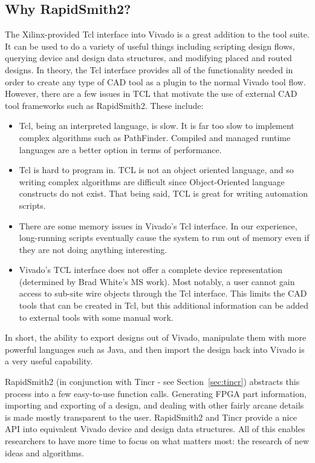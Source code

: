 \subsection{Why RapidSmith2?}
The Xilinx-provided Tcl interface into Vivado is a great addition to the tool
suite. It can be used to do a variety of useful things including scripting
design flows, querying device and design data structures, and  modifying placed
and routed designs. In theory, the Tcl interface provides all of the
functionality needed in order to create any type of CAD tool as a plugin to the
normal Vivado tool flow. However, there are a few issues in TCL that motivate
the use of external CAD tool frameworks such as RapidSmith2. These include:
\begin{itemize}
  \item Tcl, being an interpreted language, is slow. It is far too slow to
  implement complex algorithms such as PathFinder. Compiled and
  managed runtime languages are a better option in terms of performance.
  \item Tcl is hard to program in. TCL is not an object oriented language, and
  so writing complex algorithms are difficult since Object-Oriented language
  constructs do not exist. That being said, TCL is great for writing automation
  scripts.
  \item There are some memory issues in Vivado's Tcl interface. In our
  experience, long-running scripts eventually cause the system to run out of
  memory even if they are not doing anything interesting.
  \item Vivado's TCL interface does not offer a complete device representation
  (determined by Brad White's MS work). Most notably, a user cannot gain
  access to sub-site wire objects through the Tcl interface. This limits the CAD
  tools that can be created in Tcl, but this additional information can be added
  to external tools with some manual work.
\end{itemize}

\noindent
In short, the ability to export designs out of Vivado, manipulate them with more
powerful languages such as Java, and then import the design back into Vivado
is a very useful capability.

RapidSmith2 (in conjunction with Tincr - see Section~\ref{sec:tincr}) abstracts
this process into a few easy-to-use function calls. Generating FPGA part information, importing and exporting  of a design, and dealing with other fairly arcane details is made mostly transparent to the
user. RapidSmith2 and Tincr provide a nice API into equivalent Vivado device and design
data structures. All of this enables researchers to have more time to focus on what matters
most: the research of new ideas and algorithms.

